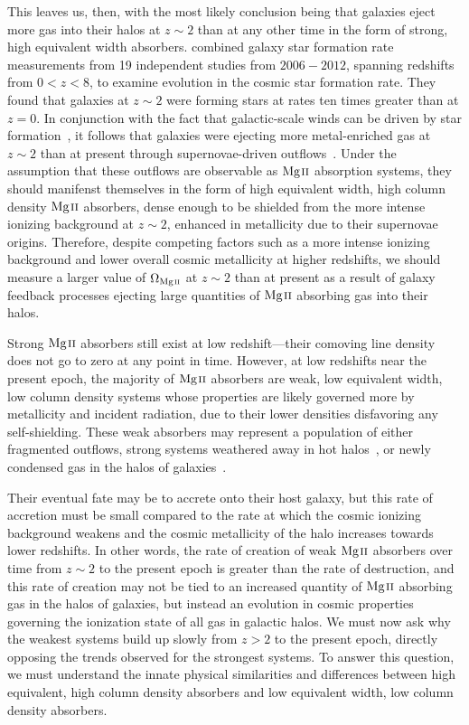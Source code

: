 \documentclass[iop,apj,numberedappendix,appendixfloats,twocolappendix]{emulateapj}
\begin{document}
This leaves us, then, with the most likely conclusion being that galaxies eject more gas into their halos at $z \sim 2$ than at any other time in the form of strong, high equivalent width absorbers. \cite{Behroozi2013sfr} combined galaxy star formation rate measurements from 19 independent studies from $2006-2012$, spanning redshifts from $0 < z < 8$, to examine evolution in the cosmic star formation rate. They found that galaxies at $z \sim 2$ were forming stars at rates ten times greater than at $z = 0$. In conjunction with the fact that galactic-scale winds can be driven by star formation~\citep{Zhu2015}, it follows that galaxies were ejecting more metal-enriched gas at $z \sim 2$ than at present through supernovae-driven outflows~\citep{Sharma2013,Kacprzak2012-PA,Nestor2011}. Under the assumption that these outflows are observable as ${\hbox{{\rm Mg}\kern 0.1em{\sc ii}}}$ absorption systems, they should manifenst themselves in the form of high equivalent width, high column density ${\hbox{{\rm Mg}\kern 0.1em{\sc ii}}}$ absorbers, dense enough to be shielded from the more intense ionizing background at $z \sim 2$, enhanced in metallicity due to their supernovae origins. Therefore, despite competing factors such as a more intense ionizing background and lower overall cosmic metallicity at higher redshifts, we should measure a larger value of $\Omega_{\hbox{\scriptsize {\MgII}}}$ at $z \sim 2$ than at present as a result of galaxy feedback processes ejecting large quantities of ${\hbox{{\rm Mg}\kern 0.1em{\sc ii}}}$ absorbing gas into their halos.

Strong ${\hbox{{\rm Mg}\kern 0.1em{\sc ii}}}$ absorbers still exist at low redshift---their comoving line density does not go to zero at any point in time. However, at low redshifts near the present epoch, the majority of ${\hbox{{\rm Mg}\kern 0.1em{\sc ii}}}$ absorbers are weak, low equivalent width, low column density systems whose properties are likely governed more by metallicity and incident radiation, due to their lower densities disfavoring any self-shielding. These weak absorbers may represent a population of either fragmented outflows, strong systems weathered away in hot halos~\citep{HOT_HALOS_WORK}, or newly condensed gas in the halos of galaxies~\citep{Maller2004}.

 Their eventual fate may be to accrete onto their host galaxy, but this rate of accretion must be small compared to the rate at which the cosmic ionizing background weakens and the cosmic metallicity of the halo increases towards lower redshifts. In other words, the rate of creation of weak ${\hbox{{\rm Mg}\kern 0.1em{\sc ii}}}$ absorbers over time from $z \sim 2$ to the present epoch is greater than the rate of destruction, and this rate of creation may not be tied to an increased quantity of ${\hbox{{\rm Mg}\kern 0.1em{\sc ii}}}$ absorbing gas in the halos of galaxies, but instead an evolution in cosmic properties governing the ionization state of all gas in galactic halos. We must now ask why the weakest systems build up slowly from $z > 2$ to the present epoch, directly opposing the trends observed for the strongest systems. To answer this question, we must understand the innate physical similarities and differences between high equivalent, high column density absorbers and low equivalent width, low column density absorbers.
\end{document}
